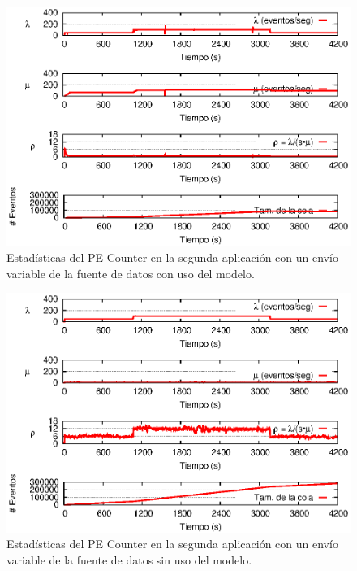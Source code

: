 \begin{figure}[!ht]
\centering
    \includegraphics[scale=1.1]{images/exp/app2/normal/cm/statusCounterPE.eps}
    \caption{Estad\'isticas del PE Counter en la segunda aplicaci\'on con un env\'io variable de la fuente de datos con uso del modelo.}
    \label{fig:app2-normal-statusCounterPE-cm}
\end{figure}

\begin{figure}[!ht]
\centering
    \includegraphics[scale=1.1]{images/exp/app2/normal/sm/statusCounterPE.eps}
    \caption{Estad\'isticas del PE Counter en la segunda aplicaci\'on con un env\'io variable de la fuente de datos sin uso del modelo.}
    \label{fig:app2-normal-statusCounterPE-sm}
\end{figure}

